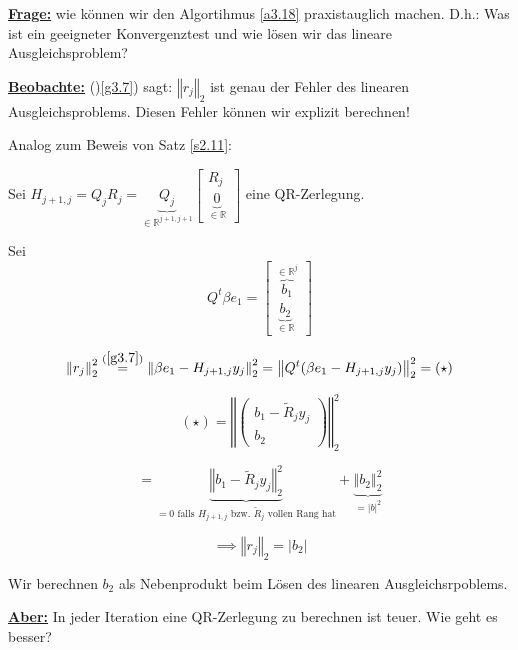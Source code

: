 \documentclass{book}
\def\R{\mathbb{R}}
\begin{document}
            \underline{\textbf{Frage:}} wie können wir den Algortihmus \ref{a3.18} praxistauglich machen.
            D.h.: Was ist ein geeigneter Konvergenztest und wie lösen wir das lineare Ausgleichsproblem?

            \underline{\textbf{Beobachte:}} ()\ref{g3.7}) sagt: $\left\Vert r_j \right\Vert_2$ ist genau der Fehler des linearen 
            Ausgleichsproblems. Diesen Fehler können wir explizit berechnen!

            Analog zum Beweis von Satz \ref{s2.11}:

            Sei \(H_{j+1,j}=Q_jR_j=\underbrace{Q_j}_{\in\R^{j+1,j+1}}\begin{bmatrix}
                R_j\\\underbrace{0}_{\in\R}
            \end{bmatrix}\) eine QR-Zerlegung.

            Sei 
            \[
                Q^t\beta e_1 = \begin{bmatrix}
                    \overbrace{b_1}^{\in\R^j}\\\underbrace{b_2}_{\in\R}
                \end{bmatrix}
            \]

            \[
                \left\Vert r_j \right\Vert_2^2 \stackrel{(\ref{g3.7})}{=} \left\Vert \beta e_1- H_{j+1,j}y_j \right\Vert_2^2 = \left\Vert  Q^t(\beta e_1- H_{j+1,j}y_j)  \right\Vert_2^2 = (\star)
            \]

            
            \[
                (\star) = \left\Vert \begin{pmatrix}
                    b_1-\tilde{R}_jy_j\\
                    b_2
                \end{pmatrix} \right\Vert_2^2    
            \]

            \[
                = \underbrace{\left\Vert  b_1-\tilde{R}_jy_j\right\Vert_2^2}_{=0\text{ falls $H_{j+1,j}$ bzw. $\tilde{R}_j$ vollen Rang hat}} + \underbrace{\left\Vert b_2 \right\Vert_2^2}_{=\vert b \vert^2} 
            \]
             
            \[
                \implies \left\Vert r_j \right\Vert_2 = \left\vert b_2 \right\vert    
            \]  

            Wir berechnen $b_2$ als Nebenprodukt beim Lösen des linearen Ausgleichsrpoblems.

            \underline{\textbf{Aber:}} In jeder Iteration eine QR-Zerlegung zu berechnen ist teuer. Wie geht es besser?
\end{document}
